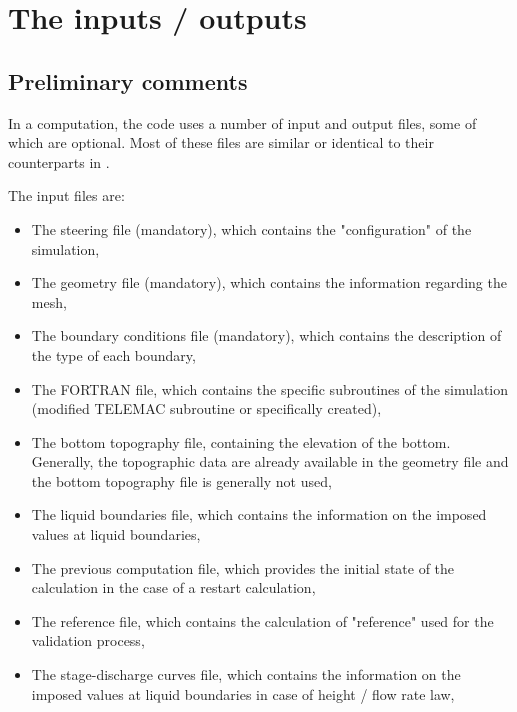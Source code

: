 \chapter{The inputs / outputs}

\section{Preliminary comments}

In a computation, the  code uses a number of input and output files,
some of which are optional. Most of these files are similar or identical to
their counterparts in .

The input files are:

\begin{itemize}
\item The steering file (mandatory), which contains the "configuration" of the
simulation,

\item The geometry file (mandatory), which contains the information regarding
the mesh,

\item The boundary conditions file (mandatory), which contains the description
of the type of each boundary,

\item The FORTRAN file, which contains the specific subroutines of the
simulation (modified TELEMAC subroutine or specifically created),

\item The bottom topography file, containing the elevation of the bottom.
Generally, the topographic data are already available in the
geometry file and the bottom topography file is generally not used,

\item The liquid boundaries file, which contains the information on the
imposed values at liquid boundaries,

\item The previous computation file, which provides the initial state of the
calculation in the case of a restart calculation,

\item The reference file, which contains the calculation of "reference" used
for the validation process,

\item The stage-discharge curves file, which contains the information on the
imposed values at liquid boundaries in case of height / flow rate law,


\end{itemize}
